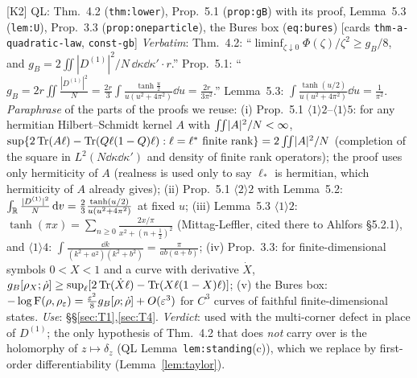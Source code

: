 \documentclass[11pt]{article}
\theoremstyle{definition}\newtheorem{hypothesis}[theorem]{Hypothesis}
\begin{document}
\begin{citedbox}{[K2] QL: Thm.~4.2 (\texttt{thm:lower}), Prop.~5.1 (\texttt{prop:gB}) with its proof,
Lemma~5.3 (\texttt{lem:U}), Prop.~3.3 (\texttt{prop:oneparticle}), the Bures box (\texttt{eq:bures})
[cards \texttt{thm-a-quadratic-law}, \texttt{const-gb}]}
\emph{Verbatim}: Thm.~4.2: ``$\liminf_{\zeta\downarrow0}\Phi(\zeta)/\zeta^2\ge g_B/8$, and
$g_B=2\iint|D^{(1)}|^2/N\,\dd\kappa\dd\kappa'\cdot r$.''  Prop.~5.1: ``$g_B=2r\iint\frac{|D^{(1)}|^2}{N}
=\frac{2r}3\int\frac{\tanh\frac u2}{u(u^2+4\pi^2)}\dd u=\frac{2r}{3\pi^2}$.''  Lemma~5.3:
$\int\frac{\tanh(u/2)}{u(u^2+4\pi^2)}\dd u=\frac1{\pi^2}$.  \emph{Paraphrase} of the parts of the proofs we
reuse: (i) Prop.~5.1 $\langle1\rangle2$--$\langle1\rangle5$: for any hermitian Hilbert--Schmidt kernel $A$
with $\iint\lvert A\rvert^2/N<\infty$, $\sup\{2\operatorname{Tr}(A\ell)-\operatorname{Tr}(Q\ell(1-Q)\ell):\ell=\ell^*\text{ finite rank}\}
=2\iint\lvert A\rvert^2/N$ (completion of the square in $L^2(N\dd\kappa\dd\kappa')$ and density of finite rank
operators); the proof uses only hermiticity of $A$ (realness is used only to say $\ell_*$ is hermitian,
which hermiticity of $A$ already gives); (ii) Prop.~5.1 $\langle2\rangle2$ with Lemma~5.2: $\int_{\mathbb
R}\frac{\lvert D^{(1)}\rvert^2}{N}\,\mathrm d v=\frac23\frac{\tanh(u/2)}{u(u^2+4\pi^2)}$ at fixed $u$; (iii) Lemma~5.3
$\langle1\rangle2$: $\tanh(\pi x)=\sum_{n\ge0}\frac{2x/\pi}{x^2+(n+\frac12)^2}$ (Mittag-Leffler, cited
there to Ahlfors \S5.2.1), and $\langle1\rangle4$: $\int\frac{\dd k}{(k^2+a^2)(k^2+b^2)}=\frac\pi{ab(a+b)}$;
(iv) Prop.~3.3: for finite-dimensional symbols $0<X<1$ and a curve with derivative $\dot X$,
$g_B[\rho_X;\dot\rho]\ge\sup_\ell[2\operatorname{Tr}(\dot X\ell)-\operatorname{Tr}(X\ell(1-X)\ell)]$; (v) the Bures box:
$-\log\operatorname{F}(\rho,\rho_\varepsilon)=\frac{\varepsilon^2}8g_B[\rho;\dot\rho]+O(\varepsilon^3)$ for $C^3$ curves of faithful
finite-dimensional states.  \emph{Use}: \S\S\ref{sec:T1},\ref{sec:T4}.  \emph{Verdict}: used with the
multi-corner defect in place of $D^{(1)}$; the only hypothesis of Thm.~4.2 that does \emph{not} carry
over is the holomorphy of $z\mapsto\delta_z$ (QL Lemma~\texttt{lem:standing}(c)), which we replace by
first-order differentiability (Lemma~\ref{lem:taylor}).
\end{citedbox}
\end{document}
